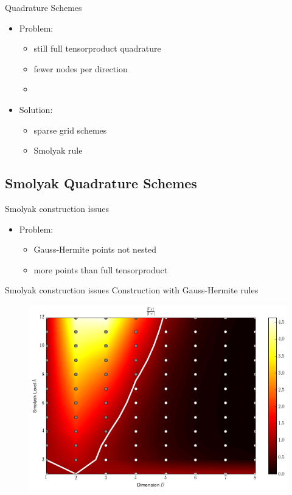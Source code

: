 \documentclass{beamer}
\begin{document}
\begin{frame}{Quadrature Schemes}
  \begin{itemize}
  \item Problem:
    \begin{itemize}
    \item still full tensorproduct quadrature
    \item fewer nodes per direction
    \item
    \end{itemize}
  \end{itemize}
  \vspace{0.2cm}
  \begin{itemize}
  \item Solution:
    \begin{itemize}
    \item sparse grid schemes
    \item Smolyak rule
    \end{itemize}
  \end{itemize}
\end{frame}




\subsection{Smolyak Quadrature Schemes}


\begin{frame}{Smolyak construction issues}
  \begin{itemize}
    \item Problem:
    \begin{itemize}
      \item Gauss-Hermite points not nested
      \item more points than full tensorproduct
    \end{itemize}
  \end{itemize}
\end{frame}

\begin{frame}{Smolyak construction issues}
  Construction with Gauss-Hermite rules
  \begin{figure}
    \centering
    \includegraphics[width=0.8\linewidth]{./fig/smolyak_gauss_ratiomap.png}
  \end{figure}
\end{frame}
\end{document}
